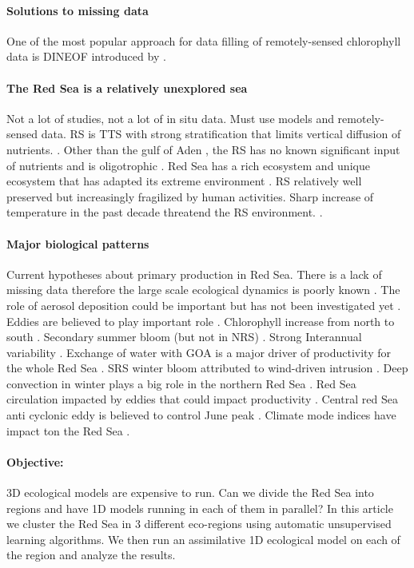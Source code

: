 \paragraph{Solutions to missing data}
One of the most popular approach for data filling of remotely-sensed 
chlorophyll data is DINEOF introduced by \citet{Beckers2003}.

\paragraph{The Red Sea is a relatively unexplored sea}
Not a lot of studies, not a lot of in situ data.
Must use models and remotely-sensed data.
RS is TTS with strong stratification that limits vertical diffusion of nutrients.
\citep{Mann2006}.
Other than the gulf of Aden \citep{Yao2015}, 
the RS has no known significant input of nutrients and
is oligotrophic \citep{Raitsos2013, Weikert1987}.
Red Sea has a rich ecosystem and unique ecosystem that has adapted its
extreme environment \citep{Raitsos2011}.
RS relatively well preserved but increasingly fragilized by human activities.
Sharp increase of temperature in the past decade threatend the RS environment.
\citep{Raitsos2011}.

\paragraph{Major biological patterns}
Current hypotheses about primary production in Red Sea.
There is a lack of missing data therefore the large scale ecological 
dynamics is poorly known \citep{Raitsos2013, Triantafyllou2014}.
The role of aerosol deposition could be important but has not been investigated
yet \citep{Raitsos2013}.
Eddies are believed to play important role \citep{Raitsos2013, Zhan2014}.
Chlorophyll increase from north to south \citep{Raitsos2013}.
Secondary summer bloom (but not in NRS) \citep{Raitsos2013}.
Strong Interannual variability \citep{Raitsos2013}.
Exchange of water with GOA is a major driver of productivity for the 
whole Red Sea \citep{Triantafyllou2014}.
SRS winter bloom attributed to wind-driven intrusion \citep{Raitsos2013}.
Deep convection in winter plays a big role in the northern Red Sea
\citep{Raitsos2013}.
Red Sea circulation impacted by eddies that could impact productivity
\citep{Zhai2013}. Central red Sea anti cyclonic eddy is believed to
control June peak \citep{Raitsos2013}.
Climate mode indices have impact ton the Red Sea \citep{Raitsos2015}.


\paragraph{Objective:}
3D ecological models are expensive to run. Can we divide the Red Sea into
regions and have 1D models running in each of them in parallel?
In this article we cluster the Red Sea in 3 different eco-regions using
automatic unsupervised learning algorithms. We then run an assimilative 1D
ecological model on each of the region and analyze the results.

